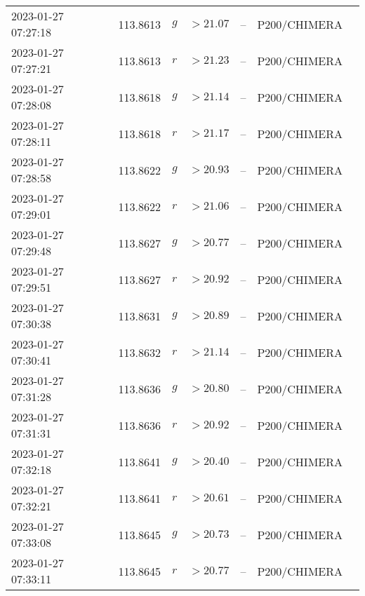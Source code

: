 \documentclass{nature_plusfigure}
\begin{document}
\begin{supplement}
\begin{center}
\begin{longtable}{lllllll}
2023-01-27 07:27:18 & 113.8613 & $g$ & $>21.07$ & -- & P200/CHIMERA &  \\ 
2023-01-27 07:27:21 & 113.8613 & $r$ & $>21.23$ & -- & P200/CHIMERA &  \\ 
2023-01-27 07:28:08 & 113.8618 & $g$ & $>21.14$ & -- & P200/CHIMERA &  \\ 
2023-01-27 07:28:11 & 113.8618 & $r$ & $>21.17$ & -- & P200/CHIMERA &  \\ 
2023-01-27 07:28:58 & 113.8622 & $g$ & $>20.93$ & -- & P200/CHIMERA &  \\ 
2023-01-27 07:29:01 & 113.8622 & $r$ & $>21.06$ & -- & P200/CHIMERA &  \\ 
2023-01-27 07:29:48 & 113.8627 & $g$ & $>20.77$ & -- & P200/CHIMERA &  \\ 
2023-01-27 07:29:51 & 113.8627 & $r$ & $>20.92$ & -- & P200/CHIMERA &  \\ 
2023-01-27 07:30:38 & 113.8631 & $g$ & $>20.89$ & -- & P200/CHIMERA &  \\ 
2023-01-27 07:30:41 & 113.8632 & $r$ & $>21.14$ & -- & P200/CHIMERA &  \\ 
2023-01-27 07:31:28 & 113.8636 & $g$ & $>20.80$ & -- & P200/CHIMERA &  \\ 
2023-01-27 07:31:31 & 113.8636 & $r$ & $>20.92$ & -- & P200/CHIMERA &  \\ 
2023-01-27 07:32:18 & 113.8641 & $g$ & $>20.40$ & -- & P200/CHIMERA &  \\ 
2023-01-27 07:32:21 & 113.8641 & $r$ & $>20.61$ & -- & P200/CHIMERA &  \\ 
2023-01-27 07:33:08 & 113.8645 & $g$ & $>20.73$ & -- & P200/CHIMERA &  \\ 
2023-01-27 07:33:11 & 113.8645 & $r$ & $>20.77$ & -- & P200/CHIMERA &  \\ 
\hline 
\end{longtable} 
\end{center} 


\clearpage


\end{supplement}
\end{document}
